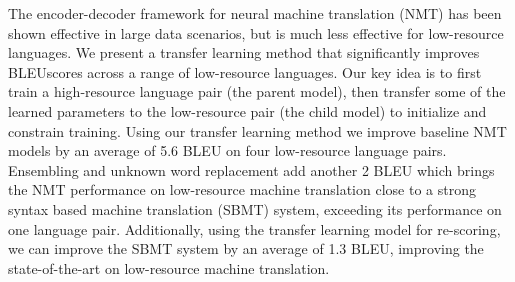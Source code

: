 The encoder-decoder framework for neural machine translation (NMT) has been shown effective in large data scenarios, but is much less effective for low-resource languages.  We present a transfer learning method that significantly improves BLEUscores across a range of low-resource languages. Our key idea is to first train a high-resource language pair (the parent model), then transfer some of the learned parameters to the low-resource pair (the child model) to initialize and constrain training.  Using our transfer learning method we improve baseline NMT models by an average of 5.6 BLEU on four low-resource language pairs.  Ensembling and unknown word replacement add another 2 BLEU which brings the NMT performance on low-resource machine translation close to a strong syntax based machine translation (SBMT) system, exceeding its performance on one language pair. Additionally, using the transfer learning model for re-scoring, we can improve the SBMT system by an average of 1.3 BLEU, improving the state-of-the-art on low-resource machine translation.
